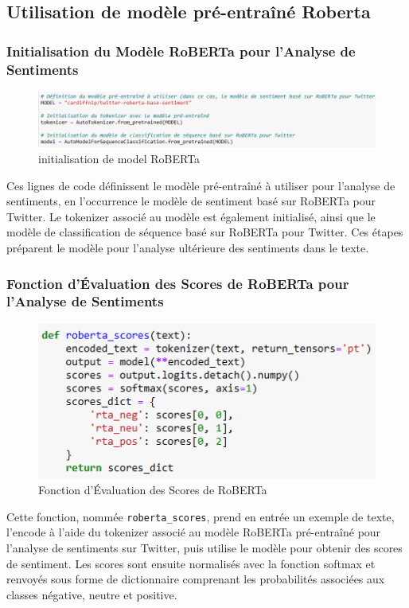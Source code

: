 

\subsection{Utilisation de modèle pré-entraîné Roberta}

\subsubsection{Initialisation du Modèle RoBERTa pour l'Analyse de Sentiments}
\begin{figure}[h]
    \centering
    \includegraphics[scale=0.6]{assets/iniRoberta.PNG}
    \caption{initialisation de model RoBERTa}
    \label{fig:initroberta}
\end{figure}
Ces lignes de code définissent le modèle pré-entraîné à utiliser pour l'analyse de sentiments, en l'occurrence le modèle de sentiment basé sur RoBERTa pour Twitter. Le tokenizer associé au modèle est également initialisé, ainsi que le modèle de classification de séquence basé sur RoBERTa pour Twitter. Ces étapes préparent le modèle pour l'analyse ultérieure des sentiments dans le texte.


\subsubsection{Fonction d'Évaluation des Scores de RoBERTa pour l'Analyse de Sentiments}

\begin{figure}[h]
    \centering
    \includegraphics[scale=0.6]{assets/robertaFun.PNG}
    \caption{Fonction d'Évaluation des Scores de RoBERTa}
    \label{fig:evalfunroberta}
\end{figure}
Cette fonction, nommée \texttt{roberta\_scores}, prend en entrée un exemple de texte, l'encode à l'aide du tokenizer associé au modèle RoBERTa pré-entraîné pour l'analyse de sentiments sur Twitter, puis utilise le modèle pour obtenir des scores de sentiment. Les scores sont ensuite normalisés avec la fonction softmax et renvoyés sous forme de dictionnaire comprenant les probabilités associées aux classes négative, neutre et positive.

